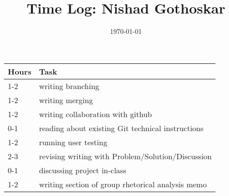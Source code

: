 \documentclass{article}
\title{Time Log: Nishad Gothoskar}
\date{\today}
\begin{document}
\maketitle

\begin{table}[h]
\centering
\label{my-label}
\begin{tabular}{ll}
\textbf{Hours} & \textbf{Task}            \\ \hline
1-2&writing branching\\
1-2&writing merging\\
1-2&writing collaboration with github\\
0-1&reading about existing Git technical instructions\\
1-2&running user testing\\
2-3&revising writing with Problem/Solution/Discussion\\
0-1&discussing project in-class\\
1-2&writing section of group rhetorical analysis memo\\
\end{tabular}
\end{table}
\end{document}
